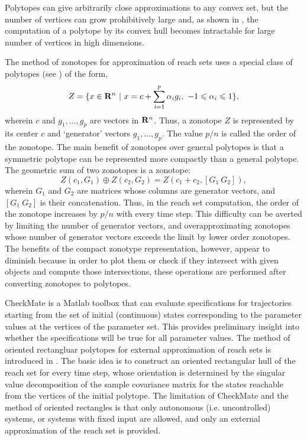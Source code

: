 Polytopes can give arbitrarily close approximations to any convex set,
but the number of vertices can grow prohibitively large and,
as shown in \cite{AVIS_BREMNER_SEIDEL_HOW_GOOD_ARE_CONVEX_HULL_ALGORITHMS}, the computation of a polytope by its convex hull
becomes intractable for large number of vertices in high dimensions.

The method of zonotopes for approximation of reach sets
\cite{GIRARD_REACHABILITY_OF_SYSTEMS_USING_ZONOTOPES, GIRARD_LE_GUERNIC_MALER_COMPUTATION_OF_REACH_SETS_OF_LINEAR_SYSTEMS, MATISSE_HOMEPAGE} uses a special class of polytopes
(see \cite{ZONOTOPE_METHODS_HOMEPAGE}) of the form,
\[ Z=\{x \in {\bf R}^n ~|~
x=c+\sum_{i=1}^p\alpha_ig_i,~ -1\leq\alpha_i\leq1\}, \]
wherein $c$ and $g_1, ..., g_p$ are vectors in ${\bf R}^n$. Thus, a
zonotope $Z$ is  represented by its center $c$ and `generator' vectors
$g_1, ..., g_p$. The value $p/n$ is called the order of the zonotope.
The main benefit of zonotopes over general polytopes is that a symmetric
polytope can be represented more compactly than a general polytope.
The geometric sum of two zonotopes is a zonotope:
\[ Z(c_1, G_1)\oplus Z(c_2, G_2) = Z(c_1+c_2, [G_1 ~ G_2]), \]
wherein $G_1$ and $G_2$ are matrices whose columns are generator vectors,
and $[G_1 ~ G_2]$ is their concatenation. Thus, in the reach set computation,
the order of the zonotope increases by $p/n$ with every time step.
This difficulty can be averted by limiting the number of generator vectors,
and overapproximating zonotopes whose number of generator vectors exceeds
the limit by lower order zonotopes.
The benefits of the compact zonotype representation, however, appear
to diminish because in order to plot them or check if they
intersect with given objects and compute those intersections,
these operations are performed after converting zonotopes to polytopes.

CheckMate \cite{CHECKMATE_HOMEPAGE} is a Matlab toolbox that can evaluate specifications
for trajectories starting from the set of initial (continuous) states
corresponding to the parameter values at the vertices of the parameter set.
This provides preliminary insight into whether the specifications will be true
for all parameter values.
The method of oriented rectangluar polytopes for external approximation
of reach sets is introduced in \cite{STURSBERG_KROGH_EFFICIENT_REPRESENTATION_AND_COMPUTATION_OF_REACH_SETS_FOR_HYBRID_SYSTEMS}.
The basic idea is to construct an oriented
rectangular hull of the reach set for every time step, whose orientation is
determined by the singular value decomposition of the sample covariance matrix
for the states reachable from the vertices of the initial polytope.
The limitation of CheckMate and the method of oriented rectangles is
that only autonomous (i.e. uncontrolled) systems, or  systems with fixed
input are allowed, and only an external approximation of the reach set
is provided.

